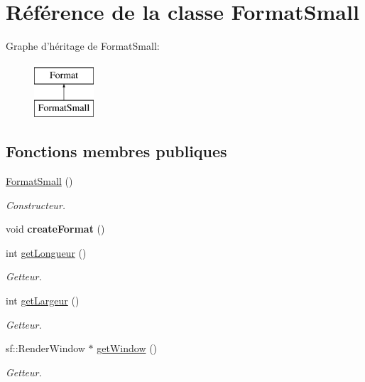 \hypertarget{classFormatSmall}{\section{Référence de la classe Format\+Small}
\label{classFormatSmall}
}
Graphe d'héritage de Format\+Small\+:\begin{figure}[H]
\begin{center}
\leavevmode
\includegraphics[height=2.000000cm]{classFormatSmall}
\end{center}
\end{figure}
\subsection*{Fonctions membres publiques}
\begin{DoxyCompactItemize}
\item 
\hypertarget{classFormatSmall_aca8b600f88876ec205174cc61e65cca2}{\hyperlink{classFormatSmall_aca8b600f88876ec205174cc61e65cca2}{Format\+Small} ()}\label{classFormatSmall_aca8b600f88876ec205174cc61e65cca2}

\begin{DoxyCompactList}\small\item\em Constructeur. \end{DoxyCompactList}\item 
\hypertarget{classFormatSmall_a985c6ed4ea1e16c267e0af5523dbba1f}{void {\bfseries create\+Format} ()}\label{classFormatSmall_a985c6ed4ea1e16c267e0af5523dbba1f}

\item 
int \hyperlink{classFormatSmall_a755b6b4f2c5f6c2fc8b5a49f08c0ec29}{get\+Longueur} ()
\begin{DoxyCompactList}\small\item\em Getteur. \end{DoxyCompactList}\item 
int \hyperlink{classFormatSmall_a64623731eba4359b6c2e32019aba42f7}{get\+Largeur} ()
\begin{DoxyCompactList}\small\item\em Getteur. \end{DoxyCompactList}\item 
sf\+::\+Render\+Window $\ast$ \hyperlink{classFormatSmall_ab15677846852366fb6dbea77dc22e82c}{get\+Window} ()
\begin{DoxyCompactList}\small\item\em Getteur. \end{DoxyCompactList}\end{DoxyCompactItemize}


